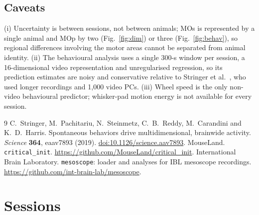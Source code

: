 \documentclass[11pt]{article}
\begin{document}
\subsection{Caveats}
 (i) Uncertainty is between sessions, not between animals; MOs is represented by a single animal and MOp by two (Fig.~\ref{fig:dim}) or three (Fig.~\ref{fig:behav}), so regional differences involving the motor areas cannot be separated from animal identity. (ii) The behavioural analysis uses a single 300-s window per session, a 16-dimensional video representation and unregularised regression, so its prediction estimates are noisy and conservative relative to Stringer et al.~\cite{stringer2019}, who used longer recordings and 1,000 video PCs. (iii) Wheel speed is the only non-video behavioural predictor; whisker-pad motion energy is not available for every session.

\begin{thebibliography}{9}
 C.~Stringer, M.~Pachitariu, N.~Steinmetz, C.~B.~Reddy, M.~Carandini and K.~D.~Harris. Spontaneous behaviors drive multidimensional, brainwide activity. \textit{Science} \textbf{364}, eaav7893 (2019). \href{https://doi.org/10.1126/science.aav7893}{doi:10.1126/science.aav7893}.
 MouseLand. \texttt{critical\_init}. \url{https://github.com/MouseLand/critical_init}.
 International Brain Laboratory. \texttt{mesoscope}: loader and analyses for IBL mesoscope recordings. \url{https://github.com/int-brain-lab/mesoscope}.
\end{thebibliography}

\clearpage
\appendix
\section{Sessions}






\end{document}
